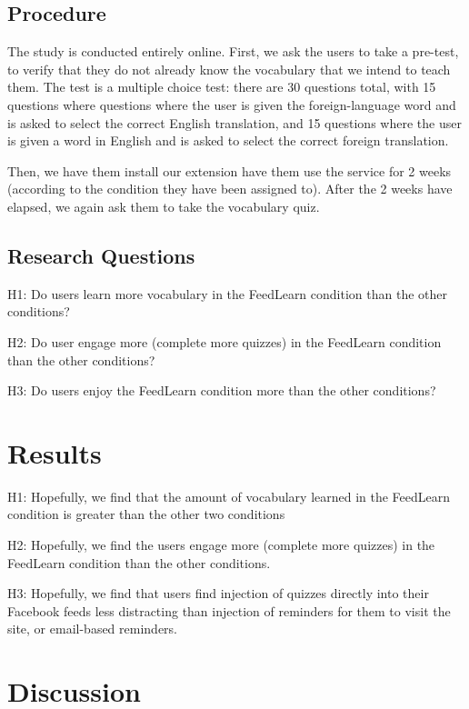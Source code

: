 \documentclass{chi-ext}
\begin{document}
\subsection{Procedure}

The study is conducted entirely online. First, we ask the users to take a pre-test, to verify that they do not already know the vocabulary that we intend to teach them. The test is a multiple choice test: there are 30 questions total, with 15 questions where questions where the user is given the foreign-language word and is asked to select the correct English translation, and 15 questions where the user is given a word in English and is asked to select the correct foreign translation.

Then, we have them install our extension have them use the service for 2 weeks (according to the condition they have been assigned to). After the 2 weeks have elapsed, we again ask them to take the vocabulary quiz.

\subsection{Research Questions}

H1: Do users learn more vocabulary in the FeedLearn condition than the other conditions?

H2: Do user engage more (complete more quizzes) in the FeedLearn condition than the other conditions?

H3: Do users enjoy the FeedLearn condition more than the other conditions?

\section{Results}

H1: Hopefully, we find that the amount of vocabulary learned in the FeedLearn condition is greater than the other two conditions

H2: Hopefully, we find the users engage more (complete more quizzes) in the FeedLearn condition than the other conditions.

H3: Hopefully, we find that users find injection of quizzes directly into their Facebook feeds less distracting than injection of reminders for them to visit the site, or email-based reminders.

\section{Discussion}
\end{document}

